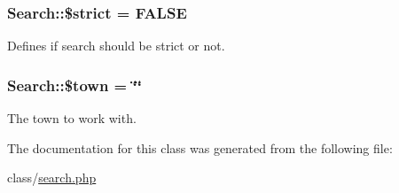 \subsubsection[{\$strict}]{\setlength{\rightskip}{0pt plus 5cm}Search\+::\$strict = F\+A\+L\+S\+E}\label{class_search_ad5a555c9913e06e21914adb4d9fc36d6}


Defines if search should be strict or not. 

\hypertarget{class_search_aab54895afb81d800b1aa7b5ed1e316d2}{}
\subsubsection[{\$town}]{\setlength{\rightskip}{0pt plus 5cm}Search\+::\$town = \char`\"{}\char`\"{}}\label{class_search_aab54895afb81d800b1aa7b5ed1e316d2}


The town to work with. 



The documentation for this class was generated from the following file\+:\begin{DoxyCompactItemize}
\item 
class/\hyperlink{search_8php}{search.\+php}\end{DoxyCompactItemize}
